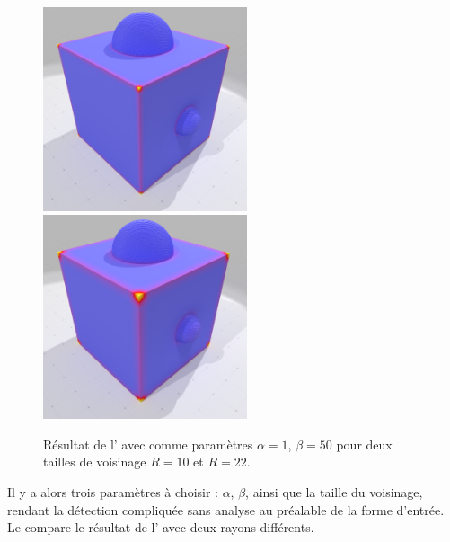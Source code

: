 \begin{figure}[hbt]
  \centering
  \includegraphics[height=6cm]{images/Feature/CubeSphere_Moments_r_10_c1}
  \includegraphics[height=6cm]{images/Feature/CubeSphere_Moments_r_22_c1}
  \caption[Résultat de l']{Résultat de l' avec comme paramètres $\alpha = 1$, $\beta = 50$ pour deux tailles de voisinage $R = 10$ et $R = 22$.}\label{fig:moment-C1}
\end{figure}
%
Il y a alors trois paramètres à choisir : $\alpha$, $\beta$, ainsi que la
taille du voisinage, rendant la détection compliquée sans analyse au préalable
de la forme d'entrée. Le  compare le résultat de l' avec deux rayons différents.
%
